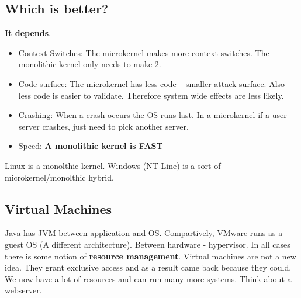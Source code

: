 \documentclass[../base_file/cs1550_notes.tex]{subfiles}
\begin{document}
\subsection{Which is better?}
\textbf{It depends}.
	\begin{itemize}	
	\item Context Switches: The microkernel makes more context switches.  The monolithic kernel only needs
			to make 2.
	\item Code surface: The microkernel has less code -- smaller attack surface.  Also less code is easier
		    to validate.  Therefore system wide effects are less likely.
	\item Crashing: When a crash occurs the OS runs last.  In a microkernel if a user server crashes, just
			need to pick another server.
	\item Speed: \textbf{A monolithic kernel is FAST}	
	\end{itemize}
Linux is a monolthic kernel.  Windows (NT Line) is a sort of microkernel/monolthic hybrid.

\subsection{Virtual Machines}
Java has JVM between application and OS\@. Compartively, VMware runs as a guest OS (A different architecture).
Between hardware - hypervisor.  In all cases there is some notion of \textbf{resource management}.  Virtual
machines are not a new idea.  They grant exclusive access and as a result came back because they could. We
now have a lot of resources and can run many more systems.  Think about a webserver.
\end{document}
